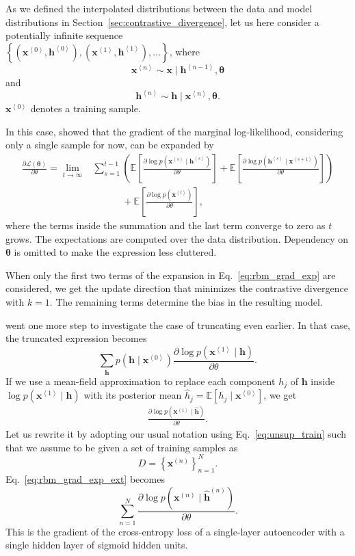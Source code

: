 \documentclass[dissertation,nocontribution]{aaltoseries}
\newcommand{\qt}[1]{\left<#1\right>}
\newcommand{\vect}[1]{\mathbf{#1}}
\newcommand{\vects}[1]{\boldsymbol{#1}}
\newcommand{\vh}[0]{\vect{h}}
\newcommand{\vx}[0]{\vect{x}}
\newcommand{\TT}[0]{{\vects{\theta}}}
\newcommand{\LL}[0]{\mathcal{L}}
\newcommand{\E}[0]{\mathbb{E}}
\begin{document}
As we defined the interpolated distributions between the
data and model distributions in
Section~\ref{sec:contrastive_divergence}, let us here
consider a potentially infinite sequence \\
$\left\{
\left(\vx^{\qt{0}}, \vh^{\qt{0}}\right),
\left(\vx^{\qt{1}},
\vh^{\qt{1}}\right), \dots \right\}$, where
\[
\vx^{\qt{n}} \sim \vx \mid \vh^{\qt{n-1}}, \TT
\]
and
\[
\vh^{\qt{n}} \sim \vh \mid \vx^{\qt{n}}, \TT.
\]
$\vx^{\qt{0}}$ denotes a training sample.

In this case, \citet{Bengio2009} showed that the gradient of
the marginal log-likelihood, considering only a single
sample for now, can be expanded by
\begin{align}
    \label{eq:rbm_grad_exp}
    \frac{\partial \LL(\TT)}{\partial \theta} = 
    \lim_{t\to\infty}&
    \sum_{s=1}^{t-1} \left( \E\left[ \frac{\partial \log
    p(\vx^{\qt{s}} \mid \vh^{\qt{s}})}{\partial \theta}
    \right]  + \E \left[ \frac{\partial \log p(\vh^{\qt{s}}
    \mid \vx^{\qt{s+1}} )}{\partial \theta} \right]
    \right) 
    \nonumber \\
    &\phantom{\sum_{s=1}^{t-1}} + \E \left[ \frac{\partial \log
    p(\vx^{\qt{t}})}{\partial \theta} 
    \right],
\end{align}
where the terms inside the summation and the last term
converge to zero as $t$ grows. The expectations are computed
over the data distribution. Dependency on $\TT$ is omitted
to make the expression less cluttered.

When only the first two terms of the expansion in
Eq.~\eqref{eq:rbm_grad_exp} are considered, we get the
update direction that minimizes the contrastive divergence
with $k=1$.
The remaining terms determine the bias in the resulting
model.

\citet{Bengio2009} went one more step to investigate the
case of truncating even earlier. In that case, the truncated
expression becomes
\[
\sum_{\vh} p(\vh \mid \vx^{\qt{0}}) \frac{\partial \log
p(\vx^{\qt{1}} \mid \vh)}{\partial \theta}.
\]
If we use a mean-field approximation to replace
each component $h_j$ of $\vh$ inside $\log
p(\vx^{\qt{1}} \mid \vh)$ with its posterior mean $\hat{h}_j =
\E\left[ h_j \mid \vx^{\qt{0}} \right]$, we get
\begin{align}
    \label{eq:rbm_grad_exp_ext}
    \frac{\partial \log p(\vx^{\qt{1}} \mid \hat{\vh})}{\partial \theta}.
\end{align}
Let us rewrite it by adopting our usual notation using
Eq.~\eqref{eq:unsup_train} such that we assume to be given
a set of training samples as
\[
D=\left\{ \vx^{(n)} \right\}_{n=1}^N.
\]
Eq.~\eqref{eq:rbm_grad_exp_ext} becomes
\[
\sum_{n=1}^N \frac{\partial \log p(\vx^{(n)} \mid
\hat{\vh}^{(n)})}{\partial \theta}.
\]
This is the gradient of
the cross-entropy loss of a single-layer autoencoder with a
single hidden layer of sigmoid hidden units.
\end{document}
